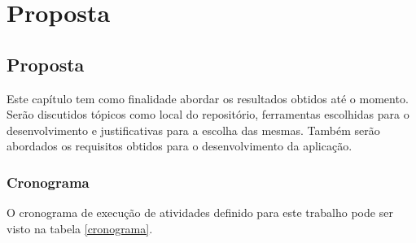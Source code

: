 \part{Proposta}

\chapter[Proposta]{Proposta}

Este capítulo tem como finalidade abordar os resultados obtidos até o momento. Serão discutidos tópicos como local do repositório, ferramentas escolhidas para o desenvolvimento e justificativas para a escolha das mesmas. Também serão abordados os requisitos obtidos para o desenvolvimento da aplicação.

\section{Cronograma}

O cronograma de execução de atividades definido para este trabalho pode ser visto na tabela \ref{cronograma}.

